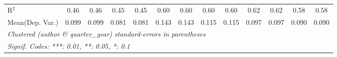 \begin{tabular}{lcccccccccccc}
   R$^2$                                    & 0.46         & 0.46     & 0.45    & 0.45     & 0.60    & 0.60         & 0.60    & 0.60          & 0.62    & 0.62         & 0.58    & 0.58\\  
Mean(Dep. Var.) & 0.099 & 0.099 & 0.081 & 0.081 & 0.143 & 0.143 & 0.115 & 0.115 & 0.097 & 0.097 & 0.090 & 0.090 \\
   \midrule \midrule
   \multicolumn{13}{l}{\emph{Clustered (author \& quarter\_year) standard-errors in parentheses}}\\
   \multicolumn{13}{l}{\emph{Signif. Codes: ***: 0.01, **: 0.05, *: 0.1}}\\
\end{tabular}
\par\endgroup
